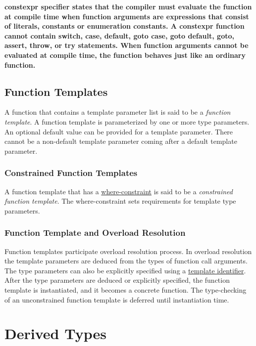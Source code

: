\documentclass[a4paper,oneside,11pt]{article}
\begin{document}
\bf{constexpr} specifier states that the compiler must evaluate the function at compile time when function arguments are expressions that consist of
literals, constants or enumeration constants. A \bf{constexpr} function cannot contain \bf{switch}, \bf{case}, \bf{default},
\bf{goto case}, \bf{goto default}, \bf{goto}, \bf{assert}, \bf{throw}, or \bf{try} statements.
When function arguments cannot be evaluated at compile time, the function behaves just like an ordinary function.

\subsection{Function Templates}

A function that contains a template parameter list is said to be a \emph{function template}.
A function template is parameterized by one or more type parameters.
An optional default value can be provided for a template parameter. There cannot be a non-default
template parameter coming after a default template parameter.

\subsubsection{Constrained Function Templates}

A function template that has a \hyperref[whereconstraint]{where\textrm{-}constraint} is said to be a
\emph{constrained function template}.
The where-constraint sets requirements for template type parameters.

\subsubsection{Function Template and Overload Resolution}

Function templates participate overload resolution process.
In overload resolution the template parameters are deduced from the types of function call arguments.
The type parameters can also be explicitly specified using a \hyperref[templateid]{template identifier}.
After the type parameters are deduced or explicitly specified, the function template is instantiated,
and it becomes a concrete function.
The type-checking of an unconstrained function template is deferred until instantiation time.

\section{Derived Types}
\end{document}

